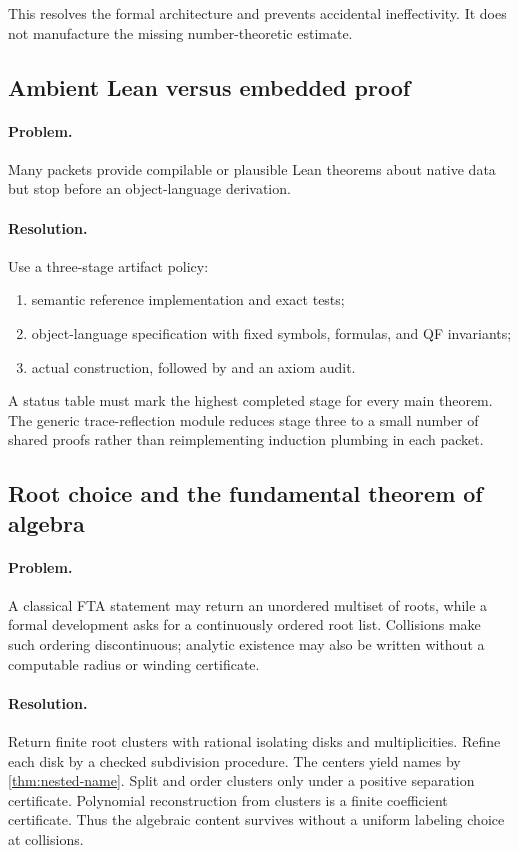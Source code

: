 This resolves the formal architecture and prevents accidental ineffectivity.
It does not manufacture the missing number-theoretic estimate.

\subsection{Ambient Lean versus embedded proof}

\paragraph{Problem.}
Many packets provide compilable or plausible Lean theorems about native data
but stop before an object-language derivation.

\paragraph{Resolution.}
Use a three-stage artifact policy:
\begin{enumerate}
\item semantic reference implementation and exact tests;
\item object-language specification with fixed  symbols, formulas,
      and QF invariants;
\item actual  construction, followed by
       and an axiom audit.
\end{enumerate}
A status table must mark the highest completed stage for every main theorem.
The generic trace-reflection module reduces stage three to a small number of
shared proofs rather than reimplementing induction plumbing in each packet.

\subsection{Root choice and the fundamental theorem of algebra}

\paragraph{Problem.}
A classical FTA statement may return an unordered multiset of roots, while a
formal development asks for a continuously ordered root list.  Collisions make
such ordering discontinuous; analytic existence may also be written without a
computable radius or winding certificate.

\paragraph{Resolution.}
Return finite root clusters with rational isolating disks and multiplicities.
Refine each disk by a checked subdivision procedure.  The centers yield names
by \cref{thm:nested-name}.  Split and order clusters only under a positive
separation certificate.  Polynomial reconstruction from clusters is a finite
coefficient certificate.  Thus the algebraic content survives without a
uniform labeling choice at collisions.

